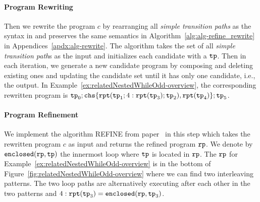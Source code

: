 \paragraph{Program Rewriting}
Then we rewrite the program $c$ by rearranging all \emph{simple transition paths} as the syntax in \cite{GulwaniJK09} and preserves the same semantics in Algorithm~\ref{alg:alg-refine_rewrite} in Appendices~\ref{apdx:alg-rewrite}.
The algorithm takes the set of all \emph{simple transition path}s as the input and initializes each candidate with a
$\mathtt{tp}$.
Then in each iteration, we generate a new candidate program by composing and deleting existing ones and updating the candidate set until it has only one candidate, i.e., the output.
%
In Example~\ref{ex:relatedNestedWhileOdd-overview}, the corresponding rewritten program is
$ 
\tpath_0; \rpchoose{\rprepeat(\tpath_1; 4:\rprepeat(\tpath_3); \tpath_2),\rprepeat(\tpath_4) }; \tpath_5
$.

\paragraph{Program Refinement}
We implement the algorithm REFINE from paper~\cite{GulwaniJK09} in this step which takes the rewritten program $c$ as input and returns the
refined program $\mathtt{rp}$. We denote by $\mathtt{enclosed}(\mathtt{rp}, \mathtt{tp})$ the innermost loop where $\mathtt{tp}$ is located in $\mathtt{rp}$.
The $\mathtt{rp}$ for Example~\ref{ex:relatedNestedWhileOdd-overview} is in the bottom of Figure~\ref{fig:relatedNestedWhileOdd-overview} where we can find two interleaving patterns.
The two loop paths are alternatively executing after each other in the two patterns and
 $4:\mathtt{rpt}(\mathtt{tp}_3) = \mathtt{enclosed}(\mathtt{rp}, \mathtt{tp}_3)$.

